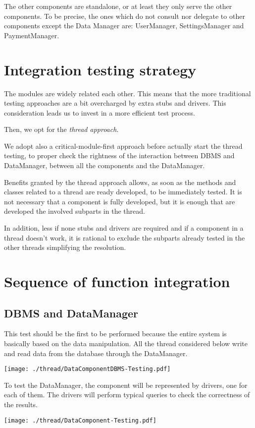 \documentclass{scrreprt}
\begin{document}
The other components are standalone, or at least they only serve the other components.
To be precise, the ones which do not consult nor delegate to other components except the Data Manager are: UserManager, SettingsManager and PaymentManager.

\section{Integration testing strategy}
The modules are widely related each other. This means that the more traditional testing approaches are a bit overcharged by extra stubs and drivers.
This consideration leads us to invest in a more efficient test process.

Then, we opt for the \emph{thread approach}.

We adopt also a critical-module-first approach before actually start the thread testing, to proper check the rightness of the interaction between DBMS and DataManager, between all the components and the DataManager.

Benefits granted by the thread approach allows, as soon as the methods and classes related to a thread are ready developed, to be immediately tested. It is not necessary that a component is fully developed, but it is enough that are developed the involved subparts in the thread.

In addition, less if none stubs and drivers are required and if a component in a thread doesn't work, it is rational to exclude the subparts already tested in the other threads simplifying the resolution.

\section{Sequence of function integration}
\subsection{DBMS and DataManager}
This test should be the first to be performed because the entire system is basically based on the data manipulation. All the thread considered below write and read data from the database through the DataManager.
\begin{center}
		\texttt{[image: ./thread/DataComponentDBMS-Testing.pdf]}
\end{center}

To test the DataManager, the component will be represented by drivers, one for each of them.
The drivers will perform typical queries to check the correctness of the results.
\begin{center}
		\texttt{[image: ./thread/DataComponent-Testing.pdf]}
\end{center}
\end{document}
